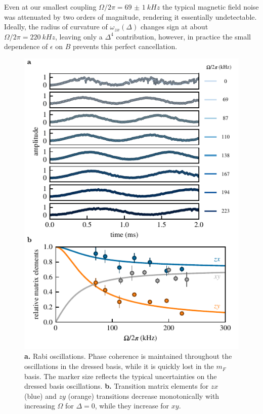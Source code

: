 Even at our smallest coupling $\Omega/2\pi=\SI{69(1)}{kHz}$ the typical magnetic field noise was attenuated by two orders of magnitude, rendering it essentially undetectable. Ideally, the radius of curvature of $\omega_{zx}(\Delta)$ changes sign at about $\Omega/2\pi = \SI{220}{kHz}$, leaving only a $\Delta^4$ contribution, however, in practice the small dependence of $\epsilon$ on $B$ prevents this perfect cancellation.
\begin{figure}[ht]
    \centering
    \includegraphics[]{Figures/Chapter6/fig3.pdf}
    \caption[Coherent driving of dressed state transitions]{{\bf a.} Rabi oscillations.
    Phase coherence is maintained throughout the oscillations in the dressed basis, while it is quickly lost in the $m_F$ basis.
    The marker size reflects the typical uncertainties on the dressed basis oscillations.
    {\bf b.} Transition matrix elements for $zx$ (blue) and $zy$ (orange) transitions decrease monotonically with increasing $\Omega$ for $\Delta=0$, while they increase for $xy$.
    }
    \label{fig:3}
\end{figure}

